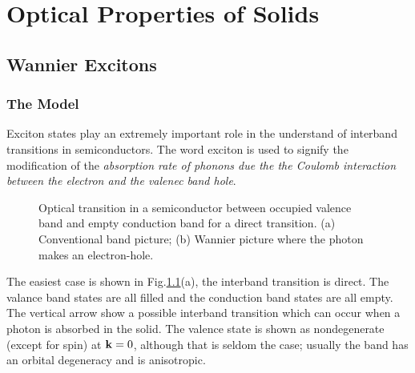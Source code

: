 \chapter{Optical Properties of Solids}

\section{Wannier Excitons}\label{s9.2}
%
\subsection{The Model}
Exciton states play an extremely important role in the understand of interband transitions in semiconductors.
The word exciton is used to signify the modification of the \textit{absorption rate of phonons due the the Coulomb interaction between the electron and the valenec band hole}.

\begin{figure}[ht]
    \centering
    \caption{Optical transition in a semiconductor between occupied valence band and empty conduction band for a direct transition. (a) Conventional band picture; (b) Wannier picture where the photon makes an electron-hole.}%
    \label{fig:9.6}
\end{figure}
%
The easiest case is shown in Fig.\ref{fig:9.6}(a), the interband transition is direct.
The valance band states are all filled and the conduction band states are all empty.
The vertical arrow show a possible interband transition which can occur when a photon is absorbed in the solid.
The valence state is shown as nondegenerate (except for spin) at $\mathbf{k}=0$, although that is seldom the case; usually the band has an orbital degeneracy and is anisotropic.

